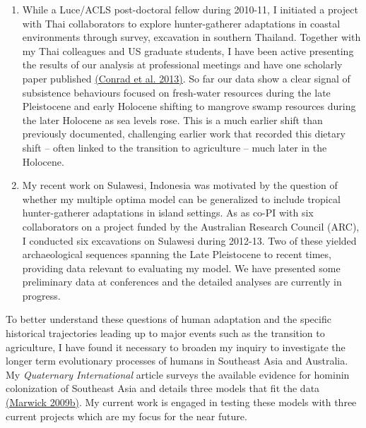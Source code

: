 \documentclass[11pt,article,oneside]{memoir}
\begin{document}
\begin{enumerate}

\item While a Luce/ACLS post-doctoral fellow during 2010-11, I initiated a project with Thai collaborators to explore hunter-gatherer adaptations in coastal environments through survey, excavation in southern Thailand. Together with my Thai colleagues and US graduate students, I have been active presenting the results of our analysis at professional meetings and have one scholarly paper published {\href{http://faculty.washington.edu/bmarwick/PDFs/Conrad_et_al_2013_TNHMJ.pdf}{(Conrad et al. 2013)}}. So far our data show a clear signal of subsistence behaviours focused on fresh-water resources during the late Pleistocene and early Holocene shifting to mangrove swamp resources during the later Holocene as sea levels rose.  This is a much earlier shift than previously documented, challenging earlier work that recorded this dietary shift – often linked to the transition to agriculture – much later in the Holocene. 

\item My recent work on Sulawesi, Indonesia was motivated by the question of whether my multiple optima model can be generalized to include tropical hunter-gatherer adaptations in island settings. As as co-PI with six collaborators on a project funded by the Australian Research Council (ARC), I conducted six excavations on Sulawesi during 2012-13. Two of these yielded archaeological sequences spanning the Late Pleistocene to recent times, providing data relevant to evaluating my model. We have presented some preliminary data at conferences and the detailed analyses are currently in progress. 

\end{enumerate}

To better understand these questions of human adaptation and the specific historical trajectories leading up to major events such as the transition to agriculture, I have found it necessary to broaden my inquiry to investigate the longer term evolutionary processes of humans in Southeast Asia and Australia. My \textit{Quaternary International} article surveys the available evidence for hominin colonization of Southeast Asia and details three models that fit the data {\href{http://faculty.washington.edu/bmarwick/PDFs/Marwick_2009_QI.pdf}{(Marwick 2009b)}}. My current work is engaged in testing these models with three current projects which are my focus for the near future. 
\end{document}
